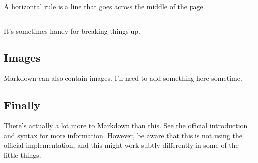A horizontal rule is a line that goes across the middle of the page.

\begin{center}\rule{0.5\linewidth}{\linethickness}\end{center}

It's sometimes handy for breaking things up.

\hypertarget{images}{%
\subsection{Images}\label{images}}

Markdown can also contain images. I'll need to add something here
sometime.

\hypertarget{finally}{%
\subsection{Finally}\label{finally}}

There's actually a lot more to Markdown than this. See the official
\href{http://daringfireball.net/projects/markdown/basics}{introduction}
and \href{http://daringfireball.net/projects/markdown/syntax}{syntax}
for more information. However, be aware that this is not using the
official implementation, and this might work subtly differently in some
of the little things.
